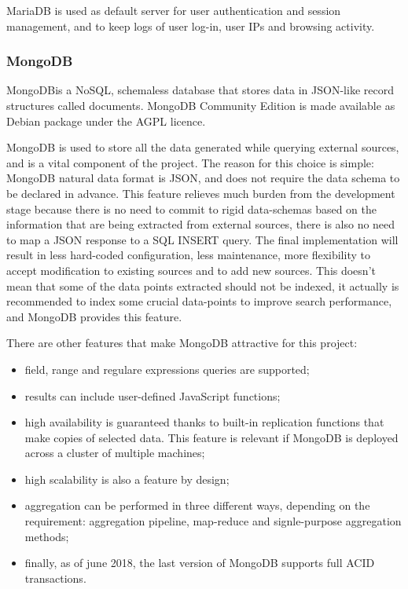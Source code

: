 MariaDB is used as default server for user authentication and session
management, and to keep logs of user log-in, user IPs and browsing activity.


\subsubsection{MongoDB}

MongoDB\texttrademark is a NoSQL, schemaless database that stores data in
JSON-like record structures called documents. MongoDB Community Edition is made
available as Debian package under the AGPL licence.

MongoDB is used to store all the data generated while querying external
sources, and is a vital component of the project. The reason for this choice is
simple: MongoDB natural data format is JSON, and does not require the
data schema to be declared in advance. This feature relieves much burden from
the development stage because there is no need to commit to rigid data-schemas
based on the information that are being extracted from external sources, there is
also no need to map a JSON response to a SQL INSERT query. The final
implementation will result in less hard-coded configuration, less maintenance,
more flexibility to accept modification to existing sources and to add new
sources. This doesn't mean that some of the data points extracted should not be
indexed, it actually is recommended to index some crucial data-points to improve
search performance, and MongoDB provides this feature.

There are other features that make MongoDB attractive for this project:
\begin{itemize}
  \item field, range and regulare expressions queries are supported;
  \item results can include user-defined JavaScript functions;
  \item high availability is guaranteed thanks to built-in replication functions
  that make copies of selected data. This feature is relevant if MongoDB is
  deployed across a cluster of multiple machines;
  \item high scalability is also a feature by design;
  \item aggregation can be performed in three different ways, depending on the
  requirement: aggregation pipeline, map-reduce and signle-purpose aggregation
  methods;
  \item finally, as of june 2018, the last version of MongoDB supports full ACID
  transactions.
\end{itemize}


